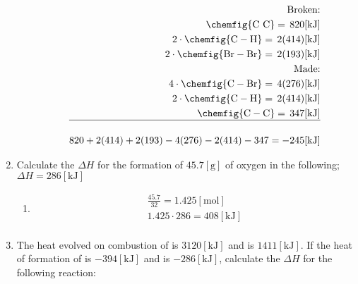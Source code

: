 \documentclass[12pt]{article}
\begin{document}
\begin{enumerate}
\begin{enumerate}
        \begin{equation}
          \begin{split}
            \text{Broken:}\\
            \chemfig{\ce{C}~\ce{C}}=\,820[\si{\kilo\joule}]\\
            2\cdot\chemfig{\ce{C}-\ce{H}}=\,2(414)[\si{\kilo\joule}]\\
            2\cdot\chemfig{\ce{Br}-\ce{Br}}=\,2(193)[\si{\kilo\joule}]\\
            \text{Made:}\\
            4\cdot\chemfig{\ce{C}-\ce{Br}}=\,4(276)[\si{\kilo\joule}]\\
            2\cdot\chemfig{\ce{C}-\ce{H}}=\,2(414)[\si{\kilo\joule}]\\
            \chemfig{\ce{C}-\ce{C}}=\,347[\si{\kilo\joule}]\\
            \hline\\
            820+2(414)+2(193)-4(276)-2(414)-347=-245[\si{\kilo\joule}]
          \end{split}
          \label{6}
        \end{equation}

    \end{enumerate}

  \item Calculate the $\Delta H$ for the formation of $45.7[\si{\gram}]$ of oxygen in the following; $\Delta H=286[\si{\kilo\joule}]$

    \begin{enumerate}

      \item {}

        \begin{equation}
          \begin{split}
            \frac{45.7}{32}=1.425[\si{\mole}]\\
            1.425\cdot286=408[\si{\kilo\joule}]\\
          \end{split}
          \label{7}
        \end{equation}

    \end{enumerate}

  \item The heat evolved on combustion of  is $3120[\si{\kilo\joule}]$ and  is $1411[\si{\kilo\joule}]$.  If the heat of formation of  is $-394[\si{\kilo\joule}]$ and  is $-286[\si{\kilo\joule}]$, calculate the $\Delta H$ for the following reaction:


\end{enumerate}
\end{document}
